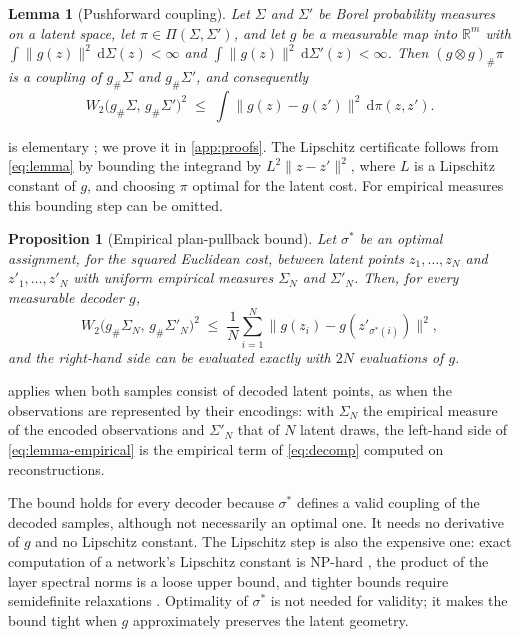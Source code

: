 \documentclass[twoside,11pt]{article}
\theoremstyle{plain}
\newtheorem{prop}{Proposition}
\newtheorem{lem}{Lemma}
\theoremstyle{definition}
\theoremstyle{remark}
\newcommand{\Wtwo}{\ensuremath{W_2}}
\newcommand{\R}{\ensuremath{\mathbb{R}}}
\begin{document}
\begin{lem}[Pushforward coupling]\label{lem:pushforward}
Let $\Sigma$ and $\Sigma'$ be Borel probability measures on a latent space, let
$\pi \in \Pi(\Sigma, \Sigma')$, and let $g$ be a measurable map into $\R^{m}$
with $\int \|g(z)\|^2 \,\mathrm{d}\Sigma(z) < \infty$ and
$\int \|g(z)\|^2 \,\mathrm{d}\Sigma'(z) < \infty$. Then $(g \otimes g)_{\#}\pi$ is a
coupling of $g_{\#}\Sigma$ and $g_{\#}\Sigma'$, and consequently
\begin{equation}\label{eq:lemma}
  \Wtwo\bigl(g_{\#}\Sigma,\, g_{\#}\Sigma'\bigr)^{2} \;\leq\;
  \int \bigl\| g(z) - g(z') \bigr\|^{2} \, \mathrm{d}\pi(z, z').
\end{equation}
\end{lem}

 is elementary \citep[Chapter~1]{villani2009}; we
prove it in \cref{app:proofs}. The Lipschitz certificate follows from
\cref{eq:lemma} by bounding the integrand by $L^{2}\|z - z'\|^{2}$, where $L$
is a Lipschitz constant of $g$, and choosing $\pi$ optimal for the latent
cost. For empirical measures this bounding step can be omitted.

\begin{prop}[Empirical plan-pullback bound]\label{prop:ppc}
Let $\sigma^{*}$ be an optimal assignment, for the squared Euclidean cost,
between latent points $z_1, \dots, z_N$ and $z'_1, \dots, z'_N$ with uniform
empirical measures $\Sigma_N$ and $\Sigma'_N$. Then, for every measurable
decoder $g$,
\begin{equation}\label{eq:lemma-empirical}
  \Wtwo\bigl(g_{\#}\Sigma_{N},\, g_{\#}\Sigma'_{N}\bigr)^{2} \;\leq\;
  \frac{1}{N} \sum_{i=1}^{N}
  \bigl\| g(z_i) - g(z'_{\sigma^{*}(i)}) \bigr\|^{2},
\end{equation}
and the right-hand side can be evaluated exactly with $2N$ evaluations of $g$.
\end{prop}

 applies when both samples consist of decoded latent points,
as when the observations are represented by their encodings: with
$\Sigma_N$ the empirical measure of the encoded observations and $\Sigma'_N$ that
of $N$ latent draws, the left-hand side of \cref{eq:lemma-empirical} is the
empirical term of \cref{eq:decomp} computed on reconstructions.

The bound holds for every decoder because $\sigma^{*}$ defines a valid
coupling of the decoded samples, although not necessarily an optimal one.
It needs no derivative of $g$ and no Lipschitz constant. The Lipschitz step is also the expensive one: exact computation of a network's Lipschitz constant is NP-hard
\citep{virmaux2018}, the product of the layer spectral norms
\citep{szegedy2014} is a loose upper bound, and tighter bounds require
semidefinite relaxations \citep{fazlyab2019}. Optimality of $\sigma^{*}$ is
not needed for validity; it makes the bound tight when $g$ approximately
preserves the latent geometry.
\end{document}
